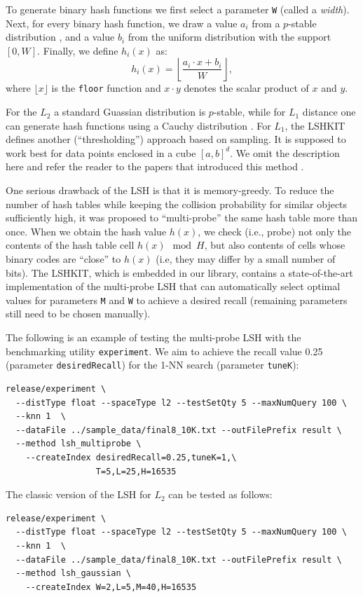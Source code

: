 \documentclass[runningheads,a4paper]{llncs}
\newcommand{\ttt}[1]{\texttt{#1}}
\begin{document}
{To generate binary hash functions we first select a parameter \texttt{W} (called a \emph{width}).
Next, for every binary hash function, we draw a value $a_i$ from a $p$-stable distribution \cite{datar2004locality},
and a value $b_i$ from the uniform distribution with the support $[0, W]$.
Finally, we define $h_i(x)$ as:
$$
h_i(x) = \left\lfloor \frac{ a_i \cdot x + b_i  }{W}\right\rfloor,
$$
where $\lfloor x \rfloor$  is the \texttt{floor} function
and $x \cdot y$ denotes the scalar product of $x$ and $y$.

For the $L_2$ a standard Guassian distribution is $p$-stable, while for $L_1$ distance one can generate hash functions using a Cauchy distribution \cite{datar2004locality}.
For $L_1$, the LSHKIT defines another (``thresholding'') approach based on sampling.
It is supposed to work best for data points enclosed in  a cube $[a,b]^d$.
We omit the description here and refer the reader to the papers that introduced this method \cite{wang2007sizing,lv2004image}.

One serious drawback of the LSH is that it is memory-greedy.
To reduce the number of hash tables while keeping the collision probability for similar objects
sufficiently high, it was proposed to ``multi-probe'' the same hash table more than once.
When we obtain the hash value $h(x)$, we check (i.e., probe) not only the contents
of the hash table cell $h(x) \mod H$, but also contents of cells 
whose binary codes are ``close'' to $h(x)$ (i.e, they may differ by a small number of bits).
The LSHKIT, which is embedded in our library, contains a state-of-the-art
implementation of the multi-probe LSH that can automatically select
optimal values for parameters \texttt{M} and \texttt{W} to achieve a desired recall (remaining
parameters still need to be chosen manually). 

The following is an example of testing the multi-probe LSH with the benchmarking utility \ttt{experiment}.
We aim to achieve the recall value 0.25 (parameter \ttt{desiredRecall}) 
for the 1-NN search (parameter \ttt{tuneK}):
{
\footnotesize
\begin{verbatim}
release/experiment \
  --distType float --spaceType l2 --testSetQty 5 --maxNumQuery 100 \
  --knn 1  \
  --dataFile ../sample_data/final8_10K.txt --outFilePrefix result \
  --method lsh_multiprobe \
    --createIndex desiredRecall=0.25,tuneK=1,\
                  T=5,L=25,H=16535
\end{verbatim}
}

The classic version of the LSH for $L_2$ can be tested as follows:
{
\footnotesize
\begin{verbatim}
release/experiment \
  --distType float --spaceType l2 --testSetQty 5 --maxNumQuery 100 \
  --knn 1  \
  --dataFile ../sample_data/final8_10K.txt --outFilePrefix result \
  --method lsh_gaussian \
    --createIndex W=2,L=5,M=40,H=16535
\end{verbatim}
}

}
\end{document}

